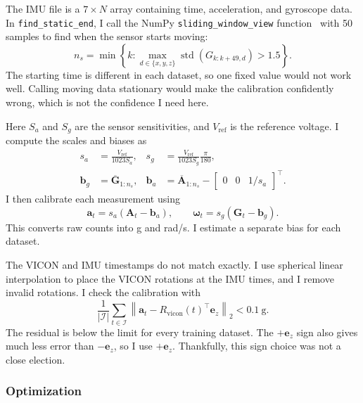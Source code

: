 \documentclass[letterpaper, 10pt, conference]{ieeeconf}
\newcommand{\w}{\boldsymbol{\omega}}
\newcommand{\ez}{\mathbf{e}_z}
\begin{document}
The IMU file is a $7\times N$ array containing time, acceleration, and
gyroscope data. In \texttt{find\_static\_end}, I call the NumPy
\texttt{sliding\_window\_view} function~\cite{numpywindow} with 50 samples to
find when the sensor starts moving:
\begin{equation}
n_s=\min\left\{k:
\max_{d\in\{x,y,z\}}\operatorname{std}(G_{k:k+49,d})>1.5\right\}.
\label{eq:static}
\end{equation}
The starting time is different in each dataset, so one fixed value would not
work well. Calling moving data stationary would make the calibration confidently
wrong, which is not the confidence I need here.

Here $S_a$ and $S_g$ are the sensor sensitivities, and
$V_{\mathrm{ref}}$ is the reference voltage. I compute the scales and biases as
\begin{equation}
\begin{aligned}
s_a&=\frac{V_{\mathrm{ref}}}{1023S_a}, &
s_g&=\frac{V_{\mathrm{ref}}}{1023S_g}\frac{\pi}{180},\\
\mathbf b_g&=\overline{\mathbf G}_{1:n_s}, &
\mathbf b_a&=\overline{\mathbf A}_{1:n_s}
 -\begin{bmatrix}0&0&1/s_a\end{bmatrix}^{\top}.
\end{aligned}
\label{eq:calibration}
\end{equation}
I then calibrate each measurement using
\begin{equation}
\mathbf a_t=s_a(\mathbf A_t-\mathbf b_a),\qquad
\w_t=s_g(\mathbf G_t-\mathbf b_g).
\label{eq:calibrated}
\end{equation}
This converts raw counts into g and rad/s. I estimate a separate bias for each
dataset.

The VICON and IMU timestamps do not match exactly. I use spherical linear
interpolation to place the VICON rotations at the IMU times, and I remove
invalid rotations. I check the calibration with
\begin{equation}
\frac{1}{|\mathcal I|}\sum_{t\in\mathcal I}
\left\|\mathbf a_t-R_{\mathrm{vicon}}(t)^\top\ez\right\|_2<0.1\ \text{g}.
\label{eq:gate}
\end{equation}
The residual is below the limit for every training dataset. The $+\ez$ sign
also gives much less error than $-\ez$, so I use $+\ez$. Thankfully, this sign
choice was not a close election.

\subsubsection{Optimization}
\end{document}
